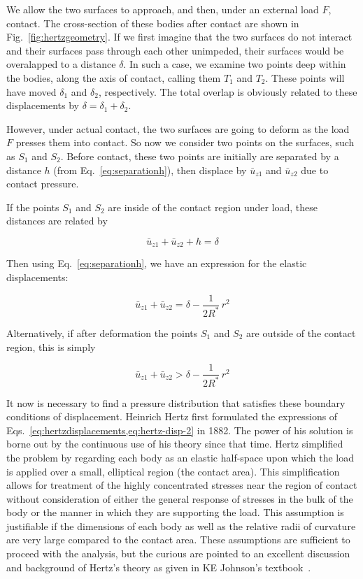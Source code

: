 We allow the two surfaces to approach, and then, under an external load $F$, contact. The cross-section of these bodies after contact are shown in Fig.~\ref{fig:hertzgeometry}. If we first imagine that the two surfaces do not interact and their surfaces pass through each other unimpeded, their surfaces would be overalapped to a distance $\delta$. In such a case, we examine two points deep within the bodies, along the axis of contact, calling them $T_{1}$ and $T_2$. These points will have moved $\delta_1$ and $\delta_2$, respectively. The total overlap is obviously related to these displacements by $\delta = \delta_1 + \delta_2$. 

However, under actual contact, the two surfaces are going to deform as the load $F$ presses them into contact. So now we consider two points on the surfaces, such as $S_1$ and $S_2$. Before contact, these two points are initially are separated by a distance $h$ (from Eq.~\ref{eq:separationh}), then displace by $\bar{u}_{z1}$ and $\bar{u}_{z2}$ due to contact pressure. 

If the points $S_1$ and $S_2$ are inside of the contact region under load, these distances are related by

\begin{equation}
	\bar{u}_{z1} + \bar{u}_{z2} + h = \delta
\end{equation}

Then using Eq.~\ref{eq:separationh}, we have an expression for the elastic displacements:

\begin{equation}\label{eq:hertzdisplacements}
	\bar{u}_{z1} + \bar{u}_{z2} = \delta - \frac{1}{2R^*} \, r^2
\end{equation}

Alternatively, if after deformation the points $S_1$ and $S_2$ are outside of the contact region, this is simply

\begin{equation}\label{eq:hertz-disp-2}
	\bar{u}_{z1} + \bar{u}_{z2} > \delta - \frac{1}{2R^*} \, r^2
\end{equation}

It now is necessary to find a pressure distribution that satisfies these boundary conditions of displacement. Heinrich Hertz first formulated the expressions of Eqs.~\ref{eq:hertzdisplacements,eq:hertz-disp-2} in 1882. The power of his solution is borne out by the continuous use of his theory since that time. Hertz simplified the problem by regarding each body as an elastic half-space upon which the load is applied over a small, elliptical region (the contact area). This simplification allows for treatment of the highly concentrated stresses near the region of contact without consideration of either the general response of stresses in the bulk of the body or the manner in which they are supporting the load. This assumption is justifiable if the dimensions of each body as well as the relative radii of curvature are very large compared to the contact area. These assumptions are sufficient to proceed with the analysis, but the curious are pointed to an excellent discussion and background of Hertz's theory as given in KE Johnson's textbook~\cite{Johnson1985}.

